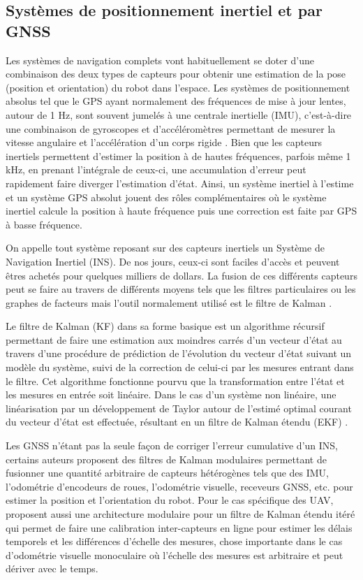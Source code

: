 \subsection{Systèmes de positionnement inertiel et par GNSS}

Les systèmes de navigation complets vont habituellement se doter d'une combinaison des deux types de capteurs pour obtenir une estimation de la pose (position et orientation) du robot dans l'espace. Les systèmes de positionnement absolus tel que le GPS ayant normalement des fréquences de mise à jour lentes, autour de 1 Hz, sont souvent jumelés à une centrale inertielle (IMU), c'est-à-dire une combinaison de gyroscopes et d'accéléromètres permettant de mesurer la vitesse angulaire et l'accélération d'un corps rigide \citep{Noureldin2013}. Bien que les capteurs inertiels permettent d'estimer la position à de hautes fréquences, parfois même 1 kHz, en prenant l'intégrale de ceux-ci, une accumulation d'erreur peut rapidement faire diverger l'estimation d'état. Ainsi, un système inertiel à l'estime et un système GPS absolut jouent des rôles complémentaires où le système inertiel calcule la position à haute fréquence puis une correction est faite par GPS à basse fréquence.

On appelle tout système reposant sur des capteurs inertiels un Système de Navigation Inertiel (INS). De nos jours, ceux-ci sont faciles d'accès et peuvent êtres achetés pour quelques milliers de dollars. La fusion de ces différents capteurs peut se faire au travers de différents moyens tels que les filtres particulaires \citep{Carvalho1997} ou les graphes de facteurs \citep{Indelman2012} mais l'outil normalement utilisé est le filtre de Kalman \citep{Noureldin2013}.

Le filtre de Kalman (KF) dans sa forme basique est un algorithme récursif permettant de faire une estimation aux moindres carrés d'un vecteur d'état au travers d'une procédure de prédiction de l'évolution du vecteur d'état suivant un modèle du système, suivi de la correction de celui-ci par les mesures entrant dans le filtre. Cet algorithme fonctionne pourvu que la transformation entre l'état et les mesures en entrée soit linéaire. Dans le cas d'un système non linéaire, une linéarisation par un développement de Taylor autour de l'estimé optimal courant du vecteur d'état est effectuée, résultant en un filtre de Kalman étendu (EKF) \citep{Chui2017}.

Les GNSS n'étant pas la seule façon de corriger l'erreur cumulative d'un INS, certains auteurs proposent des filtres de Kalman modulaires permettant de fusionner une quantité arbitraire de capteurs hétérogènes tels que des IMU, l'odométrie d'encodeurs de roues, l'odométrie visuelle, receveurs GNSS, etc. \citep{MooreEkf2014} pour estimer la position et l'orientation du robot. Pour le cas spécifique des UAV, \cite{Lynen2013} proposent aussi une architecture modulaire pour un filtre de Kalman étendu itéré qui permet de faire une calibration inter-capteurs en ligne pour estimer les délais temporels et les différences d'échelle des mesures, chose importante dans le cas d'odométrie visuelle monoculaire où l'échelle des mesures est arbitraire et peut dériver avec le temps.

